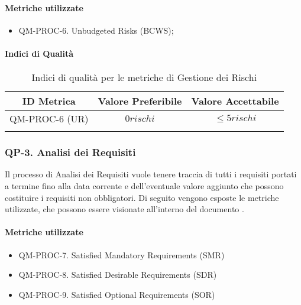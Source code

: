 		\paragraph{Metriche utilizzate}

			\begin{itemize}
				\item QM-PROC-6. Unbudgeted Risks (BCWS);
			\end{itemize}

		\paragraph{Indici di Qualità}

			\begin{center}
				\begin{longtable}{|c|c|c|}
				\hline
				\rowcolor{lighter-grayer}
				\textbf{ID Metrica} & \textbf{Valore Preferibile} & \textbf{Valore Accettabile}\\
				\hline
				\endfirsthead
				\hline
				QM-PROC-6 (UR) & \(0 rischi\) & \(\le 5 rischi\) \\
				\hline
				\caption{Indici di qualità per le metriche di Gestione dei Rischi}
				\end{longtable}
			\end{center}

	\subsubsection{QP-3. Analisi dei Requisiti}

		Il processo di Analisi dei Requisiti vuole tenere traccia di tutti i requisiti portati a termine fino alla data corrente e dell'eventuale valore aggiunto che possono costituire i requisiti non obbligatori.
		Di seguito vengono esposte le metriche utilizzate, che possono essere visionate all'interno del documento . 

		\paragraph{Metriche utilizzate}

			\begin{itemize}
				\item QM-PROC-7. Satisfied Mandatory Requirements (SMR)
				\item QM-PROC-8. Satisfied Desirable Requirements (SDR)
				\item QM-PROC-9. Satisfied Optional Requirements (SOR)
			\end{itemize}


